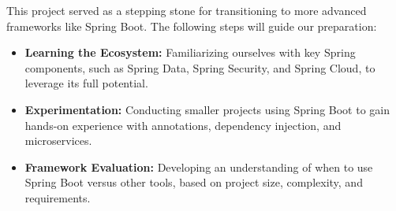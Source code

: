 This project served as a stepping stone for transitioning to more advanced frameworks like Spring Boot. The following steps will guide our preparation:

\begin{itemize}
    \item \textbf{Learning the Ecosystem:} Familiarizing ourselves with key Spring components, such as Spring Data, Spring Security, and Spring Cloud, to leverage its full potential.
    \item \textbf{Experimentation:} Conducting smaller projects using Spring Boot to gain hands-on experience with annotations, dependency injection, and microservices.
    \item \textbf{Framework Evaluation:} Developing an understanding of when to use Spring Boot versus other tools, based on project size, complexity, and requirements.
\end{itemize}


